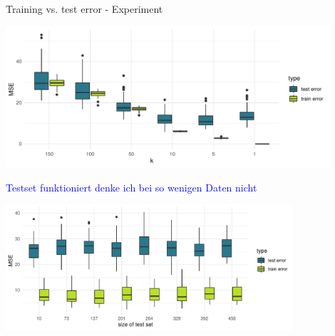 \documentclass[11pt,compress,t,notes=noshow, xcolor=table]{beamer}
\begin{document}
\begin{vbframe}{Training vs. test error - Experiment}
\begin{center}
\includegraphics[width=0.9\textwidth]{figure/fig-train-vs-test-error-3}
\end{center}

\framebreak

\textcolor{blue}{Testset funktioniert denke ich bei so wenigen Daten nicht}
\begin{center}
\includegraphics[width=0.8\textwidth]{figure/fig-train-vs-test-error-2}
\end{center}
  

\end{vbframe}
\end{document}
